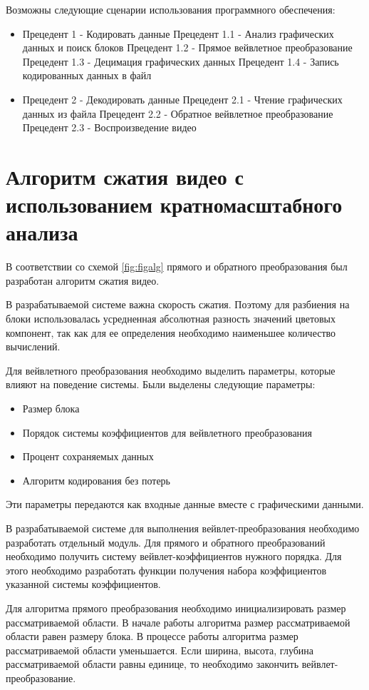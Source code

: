 Возможны следующие сценарии использования программного обеспечения:
\begin{itemize}
 \item Прецедент 1 - Кодировать данные
    \subitem Прецедент 1.1 - Анализ графических данных и поиск блоков
    \subitem Прецедент 1.2 - Прямое вейвлетное преобразование
    \subitem Прецедент 1.3 - Децимация графических данных
    \subitem Прецедент 1.4 - Запись кодированных данных в файл
 \item Прецедент 2 - Декодировать данные
    \subitem Прецедент 2.1 - Чтение графических данных из файла
    \subitem Прецедент 2.2 - Обратное вейвлетное преобразование
    \subitem Прецедент 2.3 - Воспроизведение видео
\end{itemize}



\section{Алгоритм сжатия видео с использованием кратномасштабного анализа}
В соответствии со схемой \ref{fig:figalg} прямого и обратного преобразования был разработан алгоритм сжатия видео.

В разрабатываемой системе важна скорость сжатия. Поэтому для разбиения на блоки использовалась 
усредненная абсолютная разность значений цветовых компонент, так как для ее определения необходимо наименьшее количество вычислений.

Для вейвлетного преобразования необходимо выделить параметры, которые влияют на поведение системы.
Были выделены следующие параметры:
\begin{itemize}
 \item Размер блока
 \item Порядок системы коэффициентов для вейвлетного преобразования
 \item Процент сохраняемых данных
 \item Алгоритм кодирования без потерь
\end{itemize}
Эти параметры передаются как входные данные вместе с графическими данными.

В разрабатываемой системе для выполнения вейвлет-преобразования необходимо разработать отдельный модуль. 
Для прямого и обратного преобразований необходимо получить систему вейвлет-коэффициентов нужного порядка. 
Для этого необходимо разработать функции получения набора коэффициентов указанной системы коэффициентов. 

Для алгоритма прямого преобразования необходимо инициализировать размер рассматриваемой области. 
В начале работы алгоритма размер рассматриваемой области равен размеру блока. 
В процессе работы алгоритма размер рассматриваемой области уменьшается. 
Если ширина, высота, глубина рассматриваемой области равны единице, то необходимо закончить вейвлет-преобразование. 

